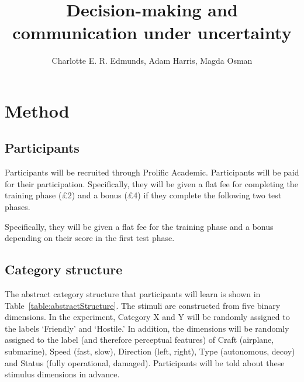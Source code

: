 \documentclass[doc, a4paper, apacite]{apa6}
\title{Decision-making and communication under uncertainty}
\author{Charlotte E. R. Edmunds, Adam Harris, Magda Osman}
\affiliation{Queen Mary, UCL, University of London \\ 11 January 2021}
\begin{document}
	\doublespacing

\section{Method}

\subsection{Participants}
Participants will be recruited through Prolific Academic.
Participants will be paid for their participation.
Specifically, they will be given a flat fee for completing the training phase (\pounds 2) and a bonus (\pounds 4) if they complete the following two test phases. 

 
Specifically, they will be given a flat fee for the training phase and a bonus depending on their score in the first test phase. 

\subsection{Category structure}
The abstract category structure that participants will learn is shown in Table~\ref{table:abstractStructure}. 
The stimuli are constructed from five binary dimensions. 
In the experiment, Category X and Y will be randomly assigned to the labels `Friendly' and `Hostile.' 
In addition, the dimensions will be randomly assigned to the label (and therefore perceptual features) of Craft (airplane, submarine), Speed (fast, slow), Direction (left, right), Type (autonomous, decoy) and Status (fully operational, damaged). 
Participants will be told about these stimulus dimensions in advance. 
\end{document}
